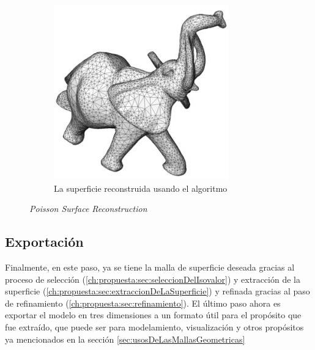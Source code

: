 \begin{figure}[h]
\begin{subfigure}[b]{0.45\textwidth}
		\includegraphics[width=\textwidth]{images/flujo/refinamiento_1_1.jpg}
		\caption{La superficie reconstruida usando el algoritmo}
		\label{f:flujoDeTrabajo:refinamiento_1_1}
	\end{subfigure}

	\caption{\emph{Poisson Surface Reconstruction}}
	\label{c:flujo:poissonSurfaceReconstruction}

\end{figure}



\subsection{Exportación}
\label{ch:propuesta:sec:exportacion}

Finalmente, en este paso, ya se tiene la malla de superficie deseada gracias al proceso de selección (\ref{ch:propuesta:sec:seleccionDelIsovalor}) y extracción de la superficie (\ref{ch:propuesta:sec:extraccionDeLaSuperficie}) y refinada gracias al paso de refinamiento (\ref{ch:propuesta:sec:refinamiento}). El último paso ahora es exportar el modelo en tres dimensiones a un formato útil para el propósito que fue extraído, que puede ser para modelamiento, visualización y otros propósitos ya mencionados en la sección \ref{sec:usosDeLasMallasGeometricas}